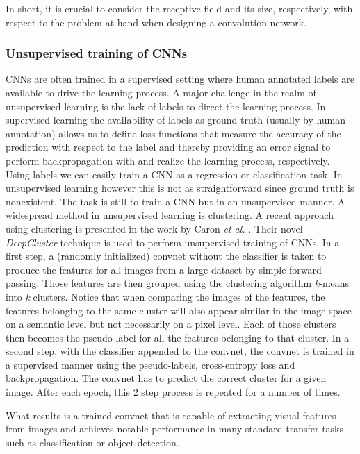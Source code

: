 \documentclass[12pt,a4paper]{article}
\begin{document}
In short, it is crucial to consider the receptive field and its size, respectively, with respect to the problem at hand when designing a convolution network.


\subsubsection{Unsupervised training of CNNs}\label{subsec:deepcluster}
CNNs are often trained in a supervised setting where human annotated labels are available to drive the learning process. A major challenge in the realm of unsupervised learning is the lack of labels to direct the learning process. In supervised learning the availability of labels as ground truth (usually by human annotation) allows us to define loss functions that measure the accuracy of the prediction with respect to the label and thereby providing an error signal to perform backpropagation with and realize the learning process, respectively. Using labels we can easily train a CNN as a regression or classification task. In unsupervised learning however this is not as straightforward since ground truth is nonexistent. The task is still to train a CNN but in an unsupervised manner. A widespread method in unsupervised learning is clustering. A recent approach using clustering is presented in the work by Caron \textit{et al.} \cite{DeepCluster}. Their novel \textit{DeepCluster} technique is used to perform unsupervised training of CNNs. In a first step, a (randomly initialized) convnet without the classifier is taken to produce the features for all images from a large dataset by simple forward passing. Those features are then grouped using the clustering algorithm \textit{k}-means into \textit{k} clusters. Notice that when comparing the images of the features, the features belonging to the same cluster will also appear similar in the image space on a semantic level but not necessarily on a pixel level. Each of those clusters then becomes the pseudo-label for all the features belonging to that cluster. In a second step, with the classifier appended to the convnet, the convnet is trained in a supervised manner using the pseudo-labels, cross-entropy loss and backpropagation. The convnet has to predict the correct cluster for a given image. After each epoch, this 2 step process is repeated for a number of times. 
\par What results is a trained convnet that is capable of extracting visual features from images and achieves notable performance in many standard transfer tasks such as classification or object detection.
\end{document}
